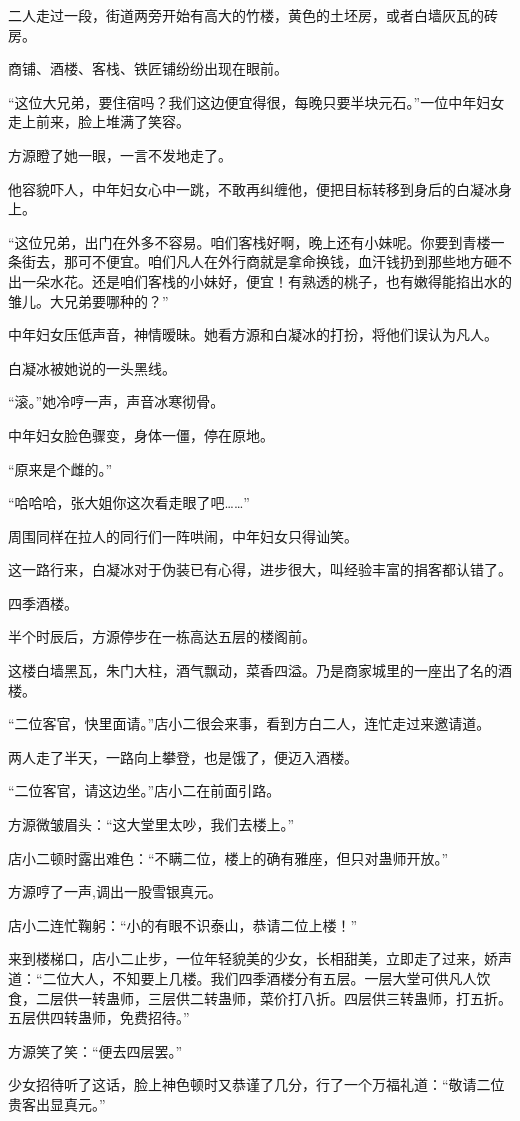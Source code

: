 \begin{this_body}
二人走过一段，街道两旁开始有高大的竹楼，黄色的土坯房，或者白墙灰瓦的砖房。

商铺、酒楼、客栈、铁匠铺纷纷出现在眼前。

“这位大兄弟，要住宿吗？我们这边便宜得很，每晚只要半块元石。”一位中年妇女走上前来，脸上堆满了笑容。

方源瞪了她一眼，一言不发地走了。

他容貌吓人，中年妇女心中一跳，不敢再纠缠他，便把目标转移到身后的白凝冰身上。

“这位兄弟，出门在外多不容易。咱们客栈好啊，晚上还有小妹呢。你要到青楼一条街去，那可不便宜。咱们凡人在外行商就是拿命换钱，血汗钱扔到那些地方砸不出一朵水花。还是咱们客栈的小妹好，便宜！有熟透的桃子，也有嫩得能掐出水的雏儿。大兄弟要哪种的？”

中年妇女压低声音，神情暧昧。她看方源和白凝冰的打扮，将他们误认为凡人。

白凝冰被她说的一头黑线。

“滚。”她冷哼一声，声音冰寒彻骨。

中年妇女脸色骤变，身体一僵，停在原地。

“原来是个雌的。”

“哈哈哈，张大姐你这次看走眼了吧……”

周围同样在拉人的同行们一阵哄闹，中年妇女只得讪笑。

这一路行来，白凝冰对于伪装已有心得，进步很大，叫经验丰富的捐客都认错了。

四季酒楼。

半个时辰后，方源停步在一栋高达五层的楼阁前。

这楼白墙黑瓦，朱门大柱，酒气飘动，菜香四溢。乃是商家城里的一座出了名的酒楼。

“二位客官，快里面请。”店小二很会来事，看到方白二人，连忙走过来邀请道。

两人走了半天，一路向上攀登，也是饿了，便迈入酒楼。

“二位客官，请这边坐。”店小二在前面引路。

方源微皱眉头：“这大堂里太吵，我们去楼上。”

店小二顿时露出难色：“不瞒二位，楼上的确有雅座，但只对蛊师开放。”

方源哼了一声,调出一股雪银真元。

店小二连忙鞠躬：“小的有眼不识泰山，恭请二位上楼！”

来到楼梯口，店小二止步，一位年轻貌美的少女，长相甜美，立即走了过来，娇声道：“二位大人，不知要上几楼。我们四季酒楼分有五层。一层大堂可供凡人饮食，二层供一转蛊师，三层供二转蛊师，菜价打八折。四层供三转蛊师，打五折。五层供四转蛊师，免费招待。”

方源笑了笑：“便去四层罢。”

少女招待听了这话，脸上神色顿时又恭谨了几分，行了一个万福礼道：“敬请二位贵客出显真元。”

\end{this_body}

